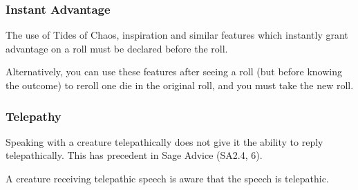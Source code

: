 \documentclass[letterpaper,twocolumn,openany,nodeprecatedcode]{dndbook}
\begin{document}
\subsubsection{Instant Advantage}
The use of Tides of Chaos, inspiration and similar features which instantly grant advantage on a roll must be declared before the roll.

Alternatively, you can use these features after seeing a roll (but before knowing the outcome) to reroll one die in the original roll, and you must take the new roll.

\subsubsection{Telepathy}
Speaking with a creature telepathically does not give it the ability to reply telepathically. This has precedent in Sage Advice (SA2.4, 6).

A creature receiving telepathic speech is aware that the speech is telepathic.
\end{document}
